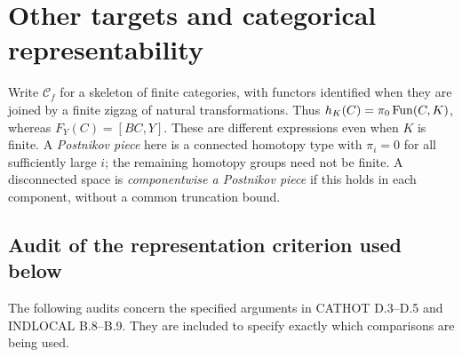 \section{Other targets and categorical representability}
\label{sec:targets}

Write $\mathcal C_f$ for a skeleton of finite categories, with functors
identified when they are joined by a finite zigzag of natural transformations.
Thus $h_K(C)=\pi_0\operatorname{Fun}(C,K)$, whereas $F_Y(C)=[BC,Y]$.
These are different expressions even when $K$ is finite.
A \emph{Postnikov piece} here is a connected homotopy type with
$\pi_i=0$ for all sufficiently large $i$; the remaining homotopy groups
need not be finite.  A disconnected space is \emph{componentwise a
Postnikov piece} if this holds in each component, without a common
truncation bound.

\subsection{Audit of the representation criterion used below}

The following audits concern the specified arguments in CATHOT D.3--D.5
and INDLOCAL B.8--B.9.  They are included to specify exactly which
comparisons are being used.

